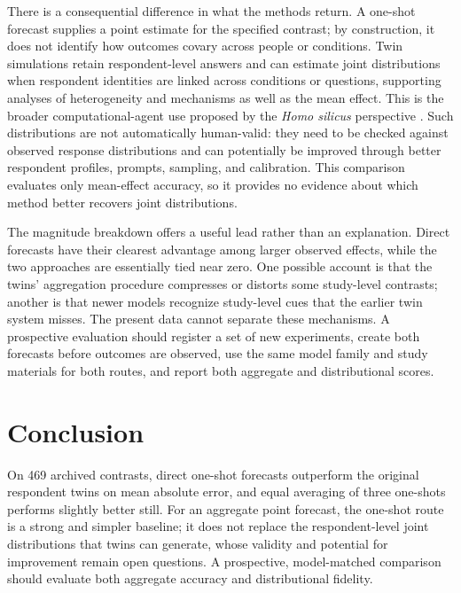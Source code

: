 \documentclass[11pt]{article}
\begin{document}
There is a consequential difference in what the methods return. A one-shot forecast supplies a point estimate for the specified contrast; by construction, it does not identify how outcomes covary across people or conditions. Twin simulations retain respondent-level answers and can estimate joint distributions when respondent identities are linked across conditions or questions, supporting analyses of heterogeneity and mechanisms as well as the mean effect. This is the broader computational-agent use proposed by the \emph{Homo silicus} perspective \citep{horton2023homosilicus}. Such distributions are not automatically human-valid: they need to be checked against observed response distributions and can potentially be improved through better respondent profiles, prompts, sampling, and calibration. This comparison evaluates only mean-effect accuracy, so it provides no evidence about which method better recovers joint distributions.

The magnitude breakdown offers a useful lead rather than an explanation. Direct forecasts have their clearest advantage among larger observed effects, while the two approaches are essentially tied near zero. One possible account is that the twins' aggregation procedure compresses or distorts some study-level contrasts; another is that newer models recognize study-level cues that the earlier twin system misses. The present data cannot separate these mechanisms. A prospective evaluation should register a set of new experiments, create both forecasts before outcomes are observed, use the same model family and study materials for both routes, and report both aggregate and distributional scores.

\section{Conclusion}
On 469 archived contrasts, direct one-shot forecasts outperform the original respondent twins on mean absolute error, and equal averaging of three one-shots performs slightly better still. For an aggregate point forecast, the one-shot route is a strong and simpler baseline; it does not replace the respondent-level joint distributions that twins can generate, whose validity and potential for improvement remain open questions. A prospective, model-matched comparison should evaluate both aggregate accuracy and distributional fidelity.



\end{document}
